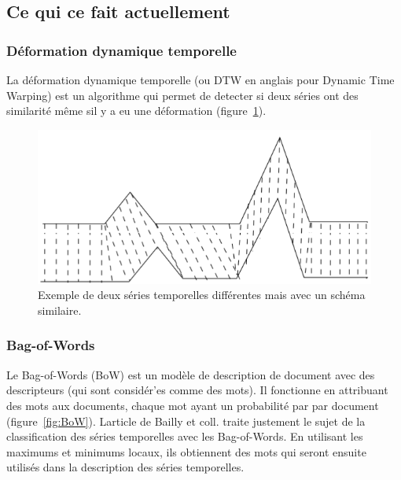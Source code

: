 \documentclass[11pt]{sdm}
\begin{document}
	\subsection{Ce qui ce fait actuellement}
	\label{seq:unknow}
		\subsubsection{D\'eformation dynamique temporelle}
		\label{seq:dtw}
			La d\'eformation dynamique temporelle (ou DTW en anglais pour Dynamic Time Warping) est un algorithme qui permet de detecter si deux s\'eries ont des similarit\'e m\^eme s\textquotesingle il y a eu une d\'eformation (figure~\ref{fig:dtw}).

			\begin{figure}[!ht]
				\centering
				\includegraphics[scale=0.6,natwidth=582,natheight=269]{figures/dtw.png}
				\caption{Exemple de deux s\'eries temporelles diff\'erentes mais avec un sch\'ema similaire.}
				\label{fig:dtw}
			\end{figure}

		\subsubsection{Bag-of-Words}
		\label{seq:bagOfWords}
			Le Bag-of-Words (BoW) est un mod\`ele de description de document avec des descripteurs (qui sont consid\'er'es comme des mots). Il fonctionne en attribuant des mots aux documents, chaque mot ayant un probabilit\'e par par document (figure~\ref{fig:BoW}). L\textquotesingle article de Bailly et coll. \cite{bailly2015bag} traite justement le sujet de la classification des s\'eries temporelles avec les Bag-of-Words. En utilisant les maximums et minimums locaux, ils obtiennent des mots qui seront ensuite utilis\'es dans la description des s\'eries temporelles.
\end{document}
